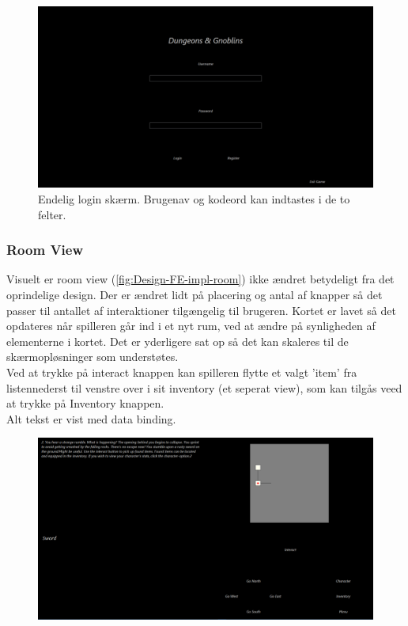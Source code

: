 \begin{figure}[h]
\centering
\includegraphics[width = \textwidth]{02-Body/Images/login_final.PNG}
\caption{Endelig login skærm. Brugenav og kodeord kan indtastes i de to felter.}
\label{fig:Design-FE-impl-login}
\end{figure}

\subsubsection{Room View}

Visuelt er room view (\autoref{fig:Design-FE-impl-room}) ikke ændret betydeligt fra det oprindelige design. Der er ændret lidt på placering og antal af knapper så det passer til antallet af interaktioner tilgængelig til brugeren. Kortet er lavet så det  opdateres når spilleren går ind i et nyt rum, ved at ændre på synligheden af elementerne i kortet. Det er yderligere sat op så det kan skaleres til de skærmopløsninger som understøtes.\\
Ved at trykke på interact knappen kan spilleren flytte et valgt 'item' fra listennederst til venstre over i sit inventory (et seperat view), som kan tilgås veed at trykke på Inventory knappen.\\
Alt tekst er vist med data binding.

\begin{figure}[h]
\centering
\includegraphics[width = \textwidth]{02-Body/Images/room_final.PNG}
\caption{}
\label{fig:Design-FE-impl-room}
\end{figure}

